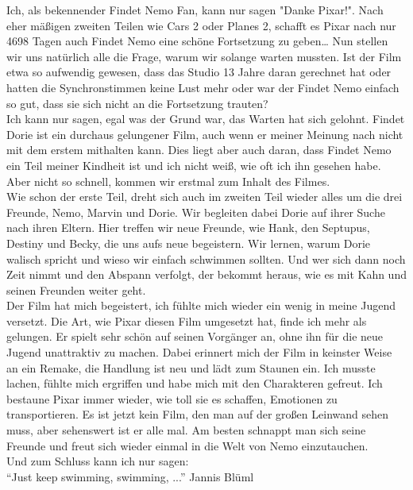 {Ich, als bekennender Findet Nemo Fan, kann nur sagen "Danke Pixar!". Nach eher mäßigen zweiten Teilen wie Cars 2 oder Planes 2, schafft es Pixar nach nur 4698 Tagen auch Findet Nemo eine schöne Fortsetzung zu geben…
}
{ Nun stellen wir uns natürlich alle die Frage, warum wir solange warten mussten. Ist der Film etwa so aufwendig gewesen, dass das Studio 13 Jahre daran gerechnet hat oder hatten die Synchronstimmen keine Lust mehr oder war der Findet Nemo einfach so gut, dass sie sich nicht an die Fortsetzung trauten? \\

    Ich kann nur sagen, egal was der Grund war, das Warten hat sich gelohnt. Findet Dorie ist ein durchaus gelungener Film, auch wenn er meiner Meinung nach nicht mit dem erstem mithalten kann. Dies liegt aber auch daran, dass Findet Nemo ein Teil meiner Kindheit ist und ich nicht weiß, wie oft ich ihn gesehen habe. Aber nicht so schnell, kommen wir erstmal zum Inhalt des Filmes. \\

    Wie schon der erste Teil, dreht sich auch im zweiten Teil wieder alles um die drei Freunde, Nemo, Marvin und Dorie. Wir begleiten dabei Dorie auf ihrer Suche nach ihren Eltern.  Hier treffen wir neue Freunde, wie Hank, den Septupus, Destiny und Becky, die uns aufs neue begeistern. Wir lernen, warum Dorie walisch spricht und wieso wir einfach schwimmen sollten. Und wer sich dann noch Zeit nimmt und den Abspann verfolgt, der bekommt heraus, wie es mit Kahn und seinen Freunden weiter geht. \\

    Der Film hat mich begeistert, ich fühlte mich wieder ein wenig in meine Jugend versetzt. Die Art, wie Pixar diesen Film umgesetzt hat, finde ich mehr als gelungen. Er spielt sehr schön auf seinen Vorgänger an, ohne ihn für die neue Jugend unattraktiv zu machen. Dabei erinnert mich der Film in keinster Weise an ein Remake, die Handlung ist neu und lädt zum Staunen ein. Ich musste lachen, fühlte mich ergriffen und habe mich mit den Charakteren gefreut. Ich bestaune Pixar immer wieder, wie toll sie es schaffen, Emotionen zu transportieren. Es ist jetzt kein Film, den man auf der großen Leinwand sehen muss, aber sehenswert ist er alle mal. Am besten schnappt man sich seine Freunde und freut sich wieder einmal in die Welt von Nemo einzutauchen.   \\

    Und zum Schluss kann ich nur sagen: \\
    "`Just keep swimming, swimming, ..."'
}
{Jannis Blüml}
